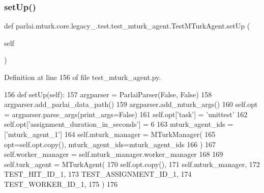 \subsubsection{\texorpdfstring{set\+Up()}{setUp()}}
{\footnotesize\ttfamily def parlai.\+mturk.\+core.\+legacy\+\_.\+test.\+test\+\_\+mturk\+\_\+agent.\+Test\+M\+Turk\+Agent.\+set\+Up (\begin{DoxyParamCaption}\item[{}]{self }\end{DoxyParamCaption})}



Definition at line 156 of file test\+\_\+mturk\+\_\+agent.\+py.


\begin{DoxyCode}
156     \textcolor{keyword}{def }setUp(self):
157         argparser = ParlaiParser(\textcolor{keyword}{False}, \textcolor{keyword}{False})
158         argparser.add\_parlai\_data\_path()
159         argparser.add\_mturk\_args()
160         self.opt = argparser.parse\_args(print\_args=\textcolor{keyword}{False})
161         self.opt[\textcolor{stringliteral}{'task'}] = \textcolor{stringliteral}{'unittest'}
162         self.opt[\textcolor{stringliteral}{'assignment\_duration\_in\_seconds'}] = 6
163         mturk\_agent\_ids = [\textcolor{stringliteral}{'mturk\_agent\_1'}]
164         self.mturk\_manager = MTurkManager(
165             opt=self.opt.copy(), mturk\_agent\_ids=mturk\_agent\_ids
166         )
167         self.worker\_manager = self.mturk\_manager.worker\_manager
168 
169         self.turk\_agent = MTurkAgent(
170             self.opt.copy(),
171             self.mturk\_manager,
172             TEST\_HIT\_ID\_1,
173             TEST\_ASSIGNMENT\_ID\_1,
174             TEST\_WORKER\_ID\_1,
175         )
176 
\end{DoxyCode}
\mbox{\label{classparlai_1_1mturk_1_1core_1_1legacy__2018_1_1test_1_1test__mturk__agent_1_1TestMTurkAgent_a7a8fde13675083b70c386a1572907040}} 
